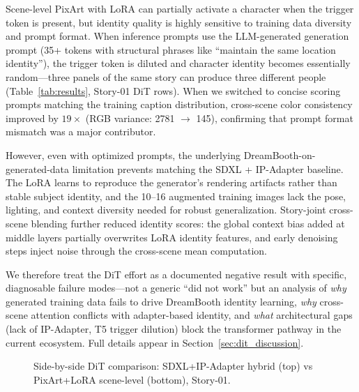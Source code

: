 Scene-level PixArt with LoRA can partially activate a character when the trigger token is present, but identity quality is highly sensitive to training data diversity and prompt format. When inference prompts use the LLM-generated generation prompt (35+ tokens with structural phrases like ``maintain the same location identity''), the trigger token is diluted and character identity becomes essentially random---three panels of the same story can produce three different people (Table~\ref{tab:results}, Story-01 DiT rows). When we switched to concise scoring prompts matching the training caption distribution, cross-scene color consistency improved by $19\times$ (RGB variance: 2781 $\to$ 145), confirming that prompt format mismatch was a major contributor.

However, even with optimized prompts, the underlying DreamBooth-on-generated-data limitation prevents matching the SDXL + IP-Adapter baseline. The LoRA learns to reproduce the generator's rendering artifacts rather than stable subject identity, and the 10--16 augmented training images lack the pose, lighting, and context diversity needed for robust generalization. Story-joint cross-scene blending further reduced identity scores: the global context bias added at middle layers partially overwrites LoRA identity features, and early denoising steps inject noise through the cross-scene mean computation.

We therefore treat the DiT effort as a documented negative result with specific, diagnosable failure modes---not a generic ``did not work'' but an analysis of \emph{why} generated training data fails to drive DreamBooth identity learning, \emph{why} cross-scene attention conflicts with adapter-based identity, and \emph{what} architectural gaps (lack of IP-Adapter, T5 trigger dilution) block the transformer pathway in the current ecosystem. Full details appear in Section~\ref{sec:dit_discussion}.

\begin{figure}[!t]
  \centering
  \caption{Side-by-side DiT comparison: SDXL+IP-Adapter hybrid (top) vs PixArt+LoRA scene-level (bottom), Story-01.}
  \label{fig:dit_vs_sdxl}
\end{figure}
